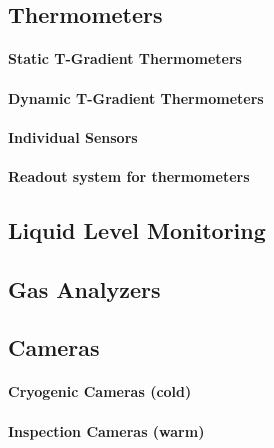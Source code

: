 \subsection{Thermometers}
\label{sec:fdsp-slow-cryo-therm}


\paragraph{Static T-Gradient Thermometers}

\paragraph{Dynamic T-Gradient Thermometers}

\paragraph{Individual Sensors}

\paragraph{Readout system for thermometers}


\subsection{Liquid Level Monitoring}
\label{sec:fdsp-slow-cryo-liq-lev}

\subsection{Gas Analyzers}
\label{sec:fdsp-slow-cryo-gas-anlyz}

\subsection{Cameras}
\label{sec:fdsp-slow-cryo-cameras}

\paragraph{Cryogenic Cameras (cold)}

\paragraph{Inspection Cameras (warm)}

